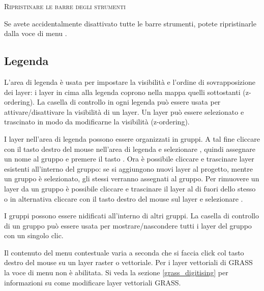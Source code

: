\begin{Tip}
\caption{\textsc{Ripristinare le barre degli strumenti}} 
Se avete accidentalmente disattivato tutte le barre strumenti,
potete ripristinarle dalla voce di menu  \arrow {}.
\end{Tip}

\subsection{Legenda}\label{label_legend}

L'area di legenda è usata per impostare la visibilità  e l'ordine di sovrapposizione dei layer:
i layer in cima alla legenda coprono nella mappa quelli sottostanti (z-ordering).
La casella di controllo in ogni legenda può essere usata per attivare/disattivare la 
visibilità  di un layer.
Un layer può essere selezionato e trascinato in modo da modificarne la visibilità (z-ordering).

I layer nell'area di legenda possono essere organizzati in gruppi. A tal fine cliccare con il tasto destro del mouse nell'area di legenda e selezionare , quindi assegnare un nome al gruppo e premere il tasto 
. Ora è possibile cliccare e trascinare layer esistenti all'interno del gruppo: se si aggiungono nuovi layer al progetto, mentre un gruppo è selezionato, gli stessi verranno assegnati al gruppo. 
Per rimuovere un layer da un gruppo è possibile cliccare e trascinare il layer al di fuori dello stesso o in alternativa cliccare con il tasto destro del mouse sul layer e selezionare .

I gruppi possono essere nidificati all'interno di altri gruppi. La casella di controllo di un gruppo può essere usata per mostrare/nascondere tutti i layer del gruppo con un singolo clic.

Il contenuto del menu contestuale varia a seconda che si faccia click col tasto destro del mouse
su un layer raster o vettoriale. Per i layer vettoriali di GRASS la voce di menu 
non è abilitata. Si veda la sezione \ref{grass_digitising} per informazioni su come modificare layer vettoriali GRASS. 

